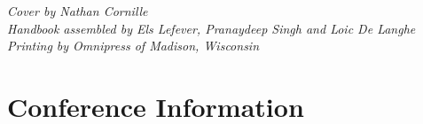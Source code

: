 \documentclass[twoside,makeidx]{book}
\begin{document}


\fancyfoot[C]{}





\cleardoublepage
\thispagestyle{empty}
\vspace*{6in}
\emph{Cover by Nathan Cornille}\\
    \emph{Handbook assembled by Els Lefever, Pranaydeep Singh and Loic De Langhe}\\
\emph{Printing by Omnipress of Madison, Wisconsin}\\

\newpage
\cleardoublepage
\fancyfoot[C]{\thepage}
\frontmatter





\setcounter{tocdepth}{2}
\tableofcontents
\mainmatter
\pagestyle{fancy}


\clearpage
\setheaders{}{}



\chapter{Conference Information}


\clearpage


\clearpage%
\setheaders{}{}

\end{document}
